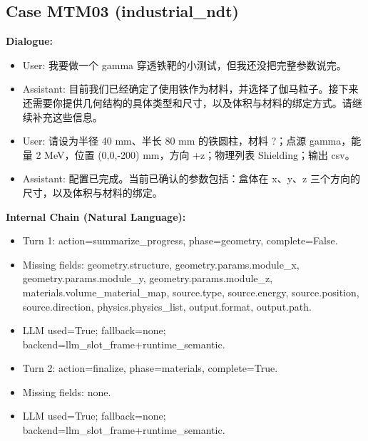 \documentclass[11pt]{ctexart}
\begin{document}
\subsection{Case MTM03 (industrial\_ndt)}
\textbf{Dialogue:}
\begin{itemize}
\item User: 我要做一个 gamma 穿透铁靶的小测试，但我还没把完整参数说完。
\item Assistant: 目前我们已经确定了使用铁作为材料，并选择了伽马粒子。接下来还需要你提供几何结构的具体类型和尺寸，以及体积与材料的绑定方式。请继续补充这些信息。
\item User: 请设为半径 40 mm、半长 80 mm 的铁圆柱，材料 ?；点源 gamma，能量 2 MeV，位置 (0,0,-200) mm，方向 +z；物理列表 Shielding；输出 csv。
\item Assistant: 配置已完成。当前已确认的参数包括：盒体在 x、y、z 三个方向的尺寸，以及体积与材料的绑定。
\end{itemize}
\textbf{Internal Chain (Natural Language):}
\begin{itemize}
\item Turn 1: action=summarize\_progress, phase=geometry, complete=False.
\item Missing fields: geometry.structure, geometry.params.module\_x, geometry.params.module\_y, geometry.params.module\_z, materials.volume\_material\_map, source.type, source.energy, source.position, source.direction, physics.physics\_list, output.format, output.path.
\item LLM used=True; fallback=none; backend=llm\_slot\_frame+runtime\_semantic.
\item Turn 2: action=finalize, phase=materials, complete=True.
\item Missing fields: none.
\item LLM used=True; fallback=none; backend=llm\_slot\_frame+runtime\_semantic.
\end{itemize}
\end{document}
